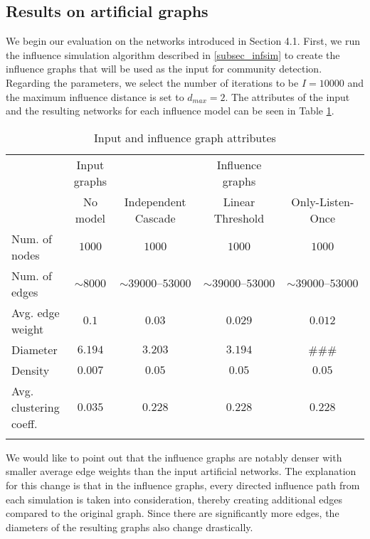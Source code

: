 \documentclass[pdflatex,sn-mathphys-num]{sn-jnl}
\begin{document}

\subsection{Results on artificial graphs}\label{subsec_res_artificial}

We begin our evaluation on the networks introduced in Section 4.1. First, we run the influence simulation algorithm described in \ref{subsec_infsim} to create the influence graphs that will be used as the input for community detection. Regarding the parameters, we select the number of iterations to be $I = 10000$ and the maximum influence distance is set to $d_{max} = 2$. The attributes of the input and the resulting networks for each influence model can be seen in Table \ref{table_influence_graphs}.

\begin{table}[ht]
\caption{Input and influence graph attributes}
\label{table_influence_graphs}
\begin{tabular}{@{}l|c|ccc@{}}
\toprule
& Input graphs & & Influence graphs & \\
& No model & Independent Cascade & Linear Threshold & Only-Listen-Once \\
\midrule
Num. of nodes & $1000$ & $1000$ & $1000$ & $1000$ \\
Num. of edges & $\sim8000$ & $\sim39000\text{--}53000$ & $\sim39000\text{--}53000$ & $\sim39000\text{--}53000$ \\
Avg. edge weight & $0.1$ & $0.03$ & $0.029$ & $0.012$ \\
Diameter & $6.194$ & $3.203$ & $3.194$ & \#\#\#\footnotemark[1] \\
Density & $0.007$ & $0.05$ & $0.05$ & $0.05$\\
Avg. clustering coeff. & $0.035$ & $0.228$ & $0.228$ & $0.228$ \\
\botrule
\end{tabular}
\end{table}

We would like to point out that the influence graphs are notably denser with smaller average edge weights than the input artificial networks. The explanation for this change is that in the influence graphs, every directed influence path from each simulation is taken into consideration, thereby creating additional edges compared to the original graph. Since there are significantly more edges, the diameters of the resulting graphs also change drastically.
\end{document}
